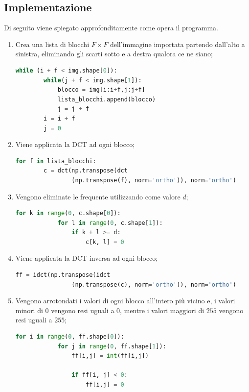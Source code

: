 \documentclass[preprint,12pt]{elsarticle}
\begin{document}
\subsection*{Implementazione}
Di seguito viene spiegato approfonditamente come opera il programma.
\begin{enumerate}
\item Crea una lista di blocchi $F \times F$ dell'immagine importata partendo dall'alto a sinistra, eliminando gli scarti sotto e a destra qualora ce ne siano;

\begin{lstlisting}[language=Python]
while (i + f < img.shape[0]):
        while(j + f < img.shape[1]):
            blocco = img[i:i+f,j:j+f]
            lista_blocchi.append(blocco)
            j = j + f
        i = i + f
        j = 0
\end{lstlisting}

\item Viene applicata la DCT ad ogni blocco;
\begin{lstlisting}[language=Python]
 for f in lista_blocchi:
        c = dct(np.transpose(dct
        		(np.transpose(f), norm='ortho')), norm='ortho')
\end{lstlisting}

\item Vengono eliminate le frequente utilizzando come valore $d$;
\begin{lstlisting}[language=Python]
for k in range(0, c.shape[0]):
            for l in range(0, c.shape[1]):
                if k + l >= d:
                    c[k, l] = 0
\end{lstlisting}

\item Viene applicata la DCT inversa ad ogni blocco;
\begin{lstlisting}[language=Python]
ff = idct(np.transpose(idct
				(np.transpose(c), norm='ortho')), norm='ortho')
\end{lstlisting}

\item Vengono arrotondati i valori di ogni blocco all'intero più vicino e, i valori minori di $0$ vengono resi uguali a $0$, mentre i valori maggiori di $255$ vengono resi uguali a $255$;
\begin{lstlisting}[language=Python]
for i in range(0, ff.shape[0]):
            for j in range(0, ff.shape[1]):
                ff[i,j] = int(ff[i,j])

                if ff[i, j] < 0:
                    ff[i,j] = 0
                    

\end{lstlisting}
\end{enumerate}
\end{document}
